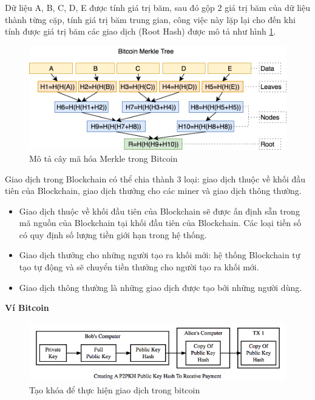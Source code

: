Dữ liệu A, B, C, D, E được tính giá trị băm, sau đó gộp 2 giá trị băm của dữ liệu thành từng cặp, tính giá trị băm trung gian, công việc này lặp lại cho đến khi tính được giá trị băm các giao dịch (Root Hash) được mô tả như hình \ref{fig:merkle}. 

\begin{figure}[htbp]
\centering
\includegraphics[width=.9\linewidth]{img/merkle.png}
\caption{Mô tả cây mã hóa Merkle trong Bitcoin}
\label{fig:merkle}
\end{figure}

Giao dịch trong Blockchain có thể chia thành 3 loại: giao dịch thuộc về khối đầu tiên của Blockchain, giao dịch thưởng cho các miner và giao dịch thông thường.

\begin{itemize}
\item Giao dịch thuộc về khối đầu tiên của Blockchain sẽ được ấn định sẵn trong mã nguồn của Blockchain tại khối đầu tiên của Blockchain. Các loại tiền số có quy định số lượng tiền giới hạn trong hệ thống.
\item Giao dịch thưởng cho những người tạo ra khối mới: hệ thống Blockchain tự tạo tự động và sẽ chuyển tiền thưởng cho người tạo ra khối mới.
\item Giao dịch thông thường là những giao dịch được tạo bởi những người dùng. 
\end{itemize}

\textbf{Ví Bitcoin}

\begin{figure}[htbp]
\centering
\includegraphics[width=.9\linewidth]{img/P2PKH.png}
\caption{Tạo khóa để thực hiện giao dịch trong bitcoin}
\label{fig:wallet_bitcoin}
\end{figure}

